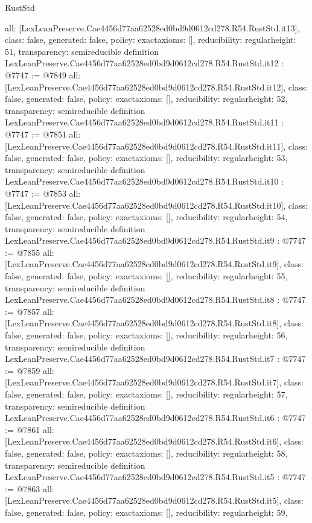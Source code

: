 \begin{lexlean}{RustStd}
\begin{coremodule}
{  all: [LexLeanPreserve.Cae4456d77aa62528ed0bd9d0612cd278.R54.RustStd.it13],
  class: false,
  generated: false,
  policy: exact{axioms: []},
  reducibility: regular{height: 51},
  transparency: semireducible
}
definition LexLeanPreserve.Cae4456d77aa62528ed0bd9d0612cd278.R54.RustStd.it12 : @7747 := @7849 {
  all: [LexLeanPreserve.Cae4456d77aa62528ed0bd9d0612cd278.R54.RustStd.it12],
  class: false,
  generated: false,
  policy: exact{axioms: []},
  reducibility: regular{height: 52},
  transparency: semireducible
}
definition LexLeanPreserve.Cae4456d77aa62528ed0bd9d0612cd278.R54.RustStd.it11 : @7747 := @7851 {
  all: [LexLeanPreserve.Cae4456d77aa62528ed0bd9d0612cd278.R54.RustStd.it11],
  class: false,
  generated: false,
  policy: exact{axioms: []},
  reducibility: regular{height: 53},
  transparency: semireducible
}
definition LexLeanPreserve.Cae4456d77aa62528ed0bd9d0612cd278.R54.RustStd.it10 : @7747 := @7853 {
  all: [LexLeanPreserve.Cae4456d77aa62528ed0bd9d0612cd278.R54.RustStd.it10],
  class: false,
  generated: false,
  policy: exact{axioms: []},
  reducibility: regular{height: 54},
  transparency: semireducible
}
definition LexLeanPreserve.Cae4456d77aa62528ed0bd9d0612cd278.R54.RustStd.it9 : @7747 := @7855 {
  all: [LexLeanPreserve.Cae4456d77aa62528ed0bd9d0612cd278.R54.RustStd.it9],
  class: false,
  generated: false,
  policy: exact{axioms: []},
  reducibility: regular{height: 55},
  transparency: semireducible
}
definition LexLeanPreserve.Cae4456d77aa62528ed0bd9d0612cd278.R54.RustStd.it8 : @7747 := @7857 {
  all: [LexLeanPreserve.Cae4456d77aa62528ed0bd9d0612cd278.R54.RustStd.it8],
  class: false,
  generated: false,
  policy: exact{axioms: []},
  reducibility: regular{height: 56},
  transparency: semireducible
}
definition LexLeanPreserve.Cae4456d77aa62528ed0bd9d0612cd278.R54.RustStd.it7 : @7747 := @7859 {
  all: [LexLeanPreserve.Cae4456d77aa62528ed0bd9d0612cd278.R54.RustStd.it7],
  class: false,
  generated: false,
  policy: exact{axioms: []},
  reducibility: regular{height: 57},
  transparency: semireducible
}
definition LexLeanPreserve.Cae4456d77aa62528ed0bd9d0612cd278.R54.RustStd.it6 : @7747 := @7861 {
  all: [LexLeanPreserve.Cae4456d77aa62528ed0bd9d0612cd278.R54.RustStd.it6],
  class: false,
  generated: false,
  policy: exact{axioms: []},
  reducibility: regular{height: 58},
  transparency: semireducible
}
definition LexLeanPreserve.Cae4456d77aa62528ed0bd9d0612cd278.R54.RustStd.it5 : @7747 := @7863 {
  all: [LexLeanPreserve.Cae4456d77aa62528ed0bd9d0612cd278.R54.RustStd.it5],
  class: false,
  generated: false,
  policy: exact{axioms: []},
  reducibility: regular{height: 59},
}
\end{coremodule}
\end{lexlean}
